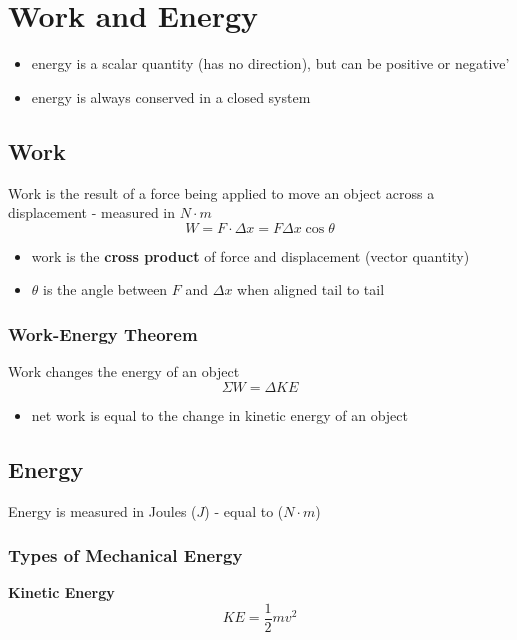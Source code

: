 \documentclass[titlepage]{article}
\begin{document}
\section{Work and Energy}
\begin{itemize}
    \item energy is a scalar quantity (has no direction), but can be positive or negative'
    \item energy is always conserved in a closed system
\end{itemize}

\subsection{Work}
Work is the result of a force being applied to move an object across a displacement - measured in $N \cdot m$
\begin{equation*}
    W = F \cdot \Delta x = F \Delta x \cos \theta
\end{equation*}
\begin{itemize}
    \item work is the \textbf{cross product} of force and displacement (vector quantity)
    \item $\theta$ is the angle between $F$ and $\Delta x$ when aligned tail to tail
\end{itemize}

\subsubsection{Work-Energy Theorem}
Work changes the energy of an object
\begin{equation*}
    \Sigma W = \Delta KE
\end{equation*}
\begin{itemize}
    \item net work is equal to the change in kinetic energy of an object
\end{itemize}

\subsection{Energy}
Energy is measured in Joules ($J$) - equal to ($N \cdot m$)
\subsubsection{Types of Mechanical Energy}

\textbf{Kinetic Energy}
\begin{equation*}
    KE = \frac{1}{2}mv^2
\end{equation*}
\end{document}
